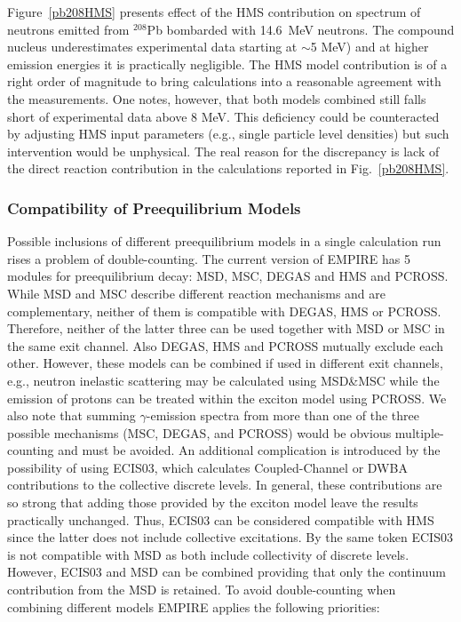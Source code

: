 Figure~\ref{pb208HMS} presents effect of the HMS contribution on spectrum of
neutrons emitted from $^{208}$Pb bombarded with 14.6~MeV neutrons. The
compound nucleus underestimates experimental data starting at $\sim$5 MeV)
and at higher emission energies it is practically negligible. The HMS model
contribution is of a right order of magnitude to bring calculations into a
reasonable agreement with the measurements. One notes, however, that both
models combined still falls short of experimental data above 8 MeV. This
deficiency could be counteracted by adjusting HMS input parameters (e.g.,
single particle level densities) but such intervention would be unphysical.
The real reason for the discrepancy is lack of the direct reaction
contribution in the calculations reported in Fig.~\ref{pb208HMS}.

\subsubsection{Compatibility of Preequilibrium Models}

Possible inclusions of different preequilibrium models in a single
calculation run rises a problem of double-counting. The current version of
EMPIRE has 5 modules for preequilibrium decay: MSD, MSC, DEGAS and HMS and
PCROSS. While MSD and MSC describe different reaction mechanisms and are
complementary, neither of them is compatible with DEGAS, HMS or PCROSS.
Therefore, neither of the latter three can be used together with MSD or MSC
in the same exit channel. Also DEGAS, HMS and PCROSS mutually exclude each
other. However, these models can be combined if used in different exit
channels, e.g., neutron inelastic scattering may be calculated using
MSD\&MSC while the emission of protons can be treated within the exciton
model using PCROSS. We also note that summing $\gamma$-emission spectra from
more than one of the three possible mechanisms (MSC, DEGAS, and PCROSS)
would be obvious multiple-counting and must be avoided. An additional
complication is introduced by the possibility of using ECIS03, which
calculates Coupled-Channel or DWBA contributions to the collective discrete
levels. In general, these contributions are so strong that adding those
provided by the exciton model leave the results practically unchanged. Thus,
ECIS03 can be considered compatible with HMS since the latter does not
include collective excitations. By the same token ECIS03 is not compatible
with MSD as both include collectivity of discrete levels. However, ECIS03
and MSD can be combined providing that only the continuum contribution from
the MSD is retained. To avoid double-counting when combining different
models EMPIRE applies the following priorities:

